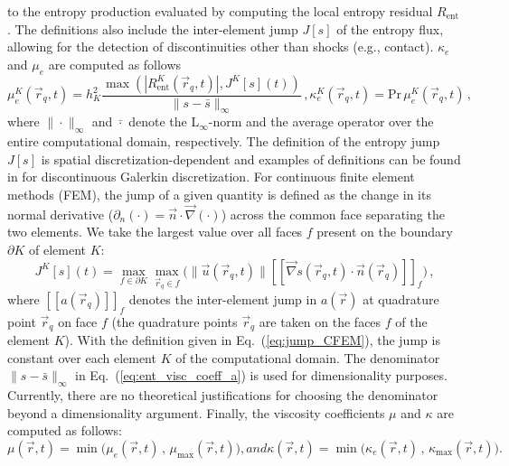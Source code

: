 \documentclass[review,10pt]{elsarticle}
\newcommand{\grad}{\vec{\nabla}}
\newcommand{\jmp}[1]{[\![#1]\!]}                     %
\renewcommand{\Pr}{\textrm{Pr}}
\newcommand{\resi}{R_\text{ent}}
\newcommand{\eqt}[1]{Eq.~(\ref{#1})}                     %
\begin{document}
to the entropy production evaluated by computing the local entropy residual $\resi$. The definitions also include the 
inter-element jump $J[s]$ of the entropy flux, %
allowing for the detection of discontinuities other than shocks (e.g., contact). $\kappa_e$ and $\mu_e$ are computed 
as follows
%
\begin{subequations}
\label{eq:ent_visc_coeff}
\begin{equation}
\label{eq:ent_visc_coeff_a}
\mu^K_e(\vec{r}_q,t) =  h_K^2 \frac{\max\left( | \resi^K(\vec{r}_q,t) |, J^K[s](t) \right)}{\| s - \bar{s} \|_\infty}  \,,
\end{equation}
\begin{equation}
\kappa^K_e(\vec{r}_q,t) = \Pr \, \mu^K_e(\vec{r}_q,t) \,,
\end{equation}
\end{subequations}
%
where $\| \cdot \|_\infty$ and $\bar{\cdot}$ denote the L$_\infty$-norm and the average operator over the entire 
computational domain, respectively. The definition of the entropy jump $J[s]$ is spatial discretization-dependent 
and examples of definitions can be found in \cite{valentin} for discontinuous Galerkin discretization. For 
continuous finite element methods (FEM), the jump of a given quantity is defined as the change in its normal 
derivative ($\partial_n ( \cdot ) =  \vec{n} \cdot \grad (\cdot)$) across the common face separating the two elements. 
We take the largest value over all faces $f$ present on the 
boundary $\partial K$ of element $K$:
%
\begin{equation}
\label{eq:jump_CFEM}
J^K[s](t) = \max_{f\in\partial K}  \max_{\vec{r}_q \in f} \Big( \| \vec{u}(\vec{r}_q,t) \| \jmp{\grad s(\vec{r}_q,t) \cdot \vec{n}(\vec{r}_q) }_f \Big) \, ,
\end{equation}
%
where $\jmp{a(\vec{r}_q)}_f$ denotes the inter-element jump in $a(\vec{r})$ at quadrature point $\vec{r}_q$ on face $f$ 
(the quadrature points $\vec{r}_q$ are taken on the faces $f$ of the element $K$). With the definition given in 
\eqt{eq:jump_CFEM}, the jump is constant over each element $K$ of the computational domain. 
The denominator $\| s - \bar{s} \|_\infty$ in \eqt{eq:ent_visc_coeff_a} is used for dimensionality purposes.
Currently, there are no theoretical justifications for choosing the denominator beyond a dimensionality argument. 
Finally, the viscosity coefficients $\mu$ and $\kappa$ are computed as follows:
%
\begin{subequations}
\begin{equation}
\mu(\vec{r},t)    = \min\Big( \mu_e(\vec{r},t)   \,,\, \mu_{\max}(\vec{r},t)    \Big) ,
\end{equation}
and
\begin{equation}
\kappa(\vec{r},t) = \min\Big( \kappa_e(\vec{r},t)\,,\, \kappa_{\max}(\vec{r},t) \Big) .
\end{equation}
\end{subequations}
\end{document}
